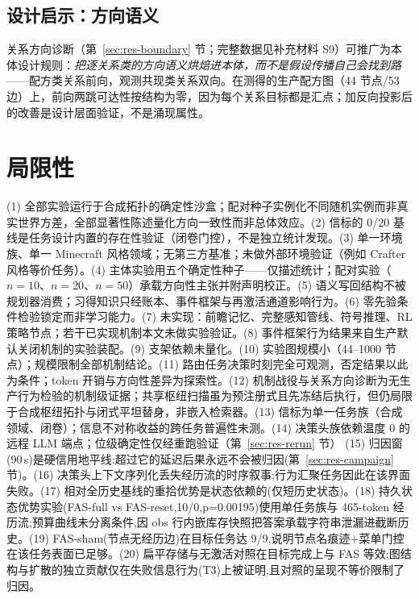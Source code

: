 \documentclass[10pt,a4paper]{ctexart}
\begin{document}
\subsection{设计启示：方向语义}
关系方向诊断（第~\ref{sec:res-boundary} 节；完整数据见补充材料 S9）可推广为本体设计规则：\emph{把逐关系类的方向语义烘焙进本体，而不是假设传播自己会找到路}——配方类关系前向，观测共现类关系双向。在测得的生产配方图（44 节点/53 边）上，前向两跳可达性按结构为零，因为每个关系目标都是汇点；加反向投影后的改善是设计层面验证，不是涌现属性。

\section{局限性}
\label{sec:limits}
(1) 全部实验运行于合成拓扑的确定性沙盒；配对种子实例化不同随机实例而非真实世界方差，全部显著性陈述量化方向一致性而非总体效应。(2) 信标的 0/20 基线是任务设计内置的存在性验证（闭卷门控），不是独立统计发现。(3) 单一环境族、单一 Minecraft 风格领域；无第三方基准；未做外部环境验证（例如 Crafter 风格等价任务）。(4) 主体实验用五个确定性种子——仅描述统计；配对实验（$n{=}10$、$n{=}20$、$n{=}50$）承载方向性主张并附声明校正。(5) 语义写回结构不被规划器消费；习得知识只经账本、事件框架与再激活通道影响行为。(6) 零先验条件检验锁定而非学习能力。(7) 未实现：前瞻记忆、完整感知管线、符号推理、RL 策略节点；若干已实现机制本文未做实验验证。(8) 事件框架行为结果来自生产默认关闭机制的实验装配。(9) 支架依赖未量化。(10) 实验图规模小（44--1000 节点）；规模限制全部机制结论。(11) 路由任务决策时刻完全可观测，否定结果以此为条件；token 开销与方向性差异为探索性。(12) 机制战役与关系方向诊断为无生产行为检验的机制级证据；共享枢纽扫描虽为预注册式且先冻结后执行，但仍局限于合成枢纽拓扑与闭式平坦替身，非嵌入检索器。(13) 信标为单一任务族（合成领域、闭卷）；信息不对称收益的跨任务普遍性未测。(14) 决策头族依赖温度 0 的远程 LLM 端点；位级确定性仅经重跑验证（第~\ref{sec:res-rerun} 节） (15) 归因窗(90\,s)是硬信用地平线:超过它的延迟后果永远不会被归因(第~\ref{sec:res-campaign} 节)。(16) 决策头上下文序列化丢失经历流的时序叙事;行为汇聚任务因此在该界面失败。(17) 相对全历史基线的重拾优势是状态依赖的(仅短历史状态)。(18) 持久状态优势实验(FAS-full vs FAS-reset,10/0,p=0.00195)使用单任务族与 465-token 经历流;预算曲线未分离条件,因 obs 行内嵌库存快照把答案承载字符串泄漏进截断历史。(19) FAS-sham(节点无经历边)在目标任务达 9/9,说明节点名痕迹+菜单门控在该任务表面已足够。(20) 扁平存储与无激活对照在目标完成上与 FAS 等效;图结构与扩散的独立贡献仅在失败信息行为(T3)上被证明,且对照的呈现不等价限制了归因。
\end{document}
